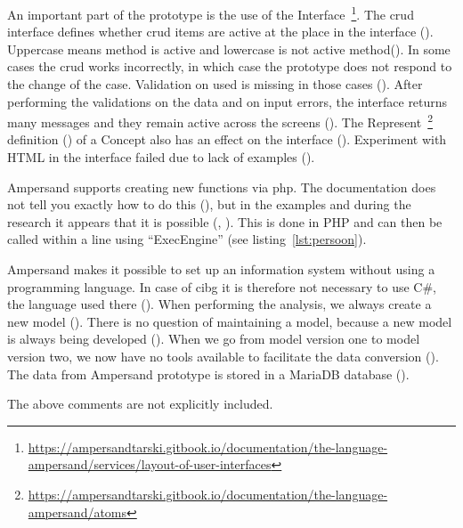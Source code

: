 An important part of the prototype is the use of the Interface~\footnote{\url{https://ampersandtarski.gitbook.io/documentation/the-language-ampersand/services/layout-of-user-interfaces}}.
The \acrshort{crud} interface defines whether \acrshort{crud} items are active at the place in the interface ().
Uppercase means method is active and lowercase is not active method().
In some cases the \acrshort{crud} works incorrectly, in which case the prototype does not respond to the change of the case.
Validation on used is missing in those cases ().
After performing the validations on the data and on input errors, the interface returns many messages and they remain active across the screens ().
The Represent~\footnote{\url{https://ampersandtarski.gitbook.io/documentation/the-language-ampersand/atoms}} definition () of a Concept also has an effect on the interface ().
Experiment with HTML in the interface failed due to lack of examples ().
\label{s:3_4_php}

Ampersand supports creating new functions via php.
The documentation does not tell you exactly how to do this (), but in the examples and during the research it appears that it is possible (, ).
This is done in PHP and can then be called within a line using ``ExecEngine'' (see listing~\ref{lst:persoon}).
\label{s:3_5_model_maintenance}

Ampersand makes it possible to set up an information system without using a programming language.
In case of \acrshort{cibg} it is therefore not necessary to use C\#, the language used there ().
When performing the analysis, we always create a new model ().
There is no question of maintaining a model, because a new model is always being developed ().
When we go from model version one to model version two, we now have no tools available to facilitate the data conversion ().
The data from Ampersand prototype is stored in a MariaDB database ().
\label{s:3_6_exclude}

The above comments are not explicitly included.